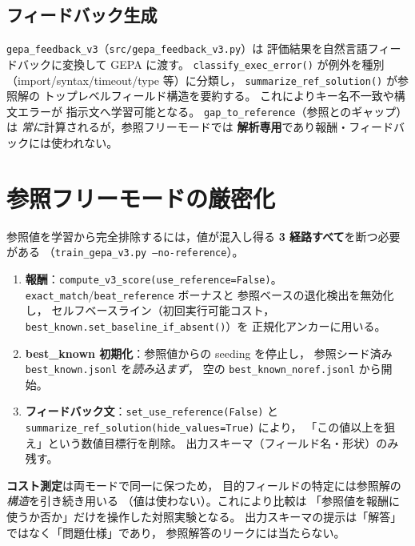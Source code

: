 \documentclass[uplatex,dvipdfmx,a4paper,11pt]{jsarticle}
\begin{document}
\subsection{フィードバック生成}

\texttt{gepa\_feedback\_v3}（\texttt{src/gepa\_feedback\_v3.py}）は
評価結果を自然言語フィードバックに変換して GEPA に渡す。
\texttt{classify\_exec\_error()} が例外を種別
（import/syntax/timeout/type 等）に分類し，
\texttt{summarize\_ref\_solution()} が参照解の
トップレベルフィールド構造を要約する。
これによりキー名不一致や構文エラーが
指示文へ学習可能となる。
\texttt{gap\_to\_reference}（参照とのギャップ）は
\emph{常に}計算されるが，参照フリーモードでは
\textbf{解析専用}であり報酬・フィードバックには使われない。

\section{参照フリーモードの厳密化}\label{sec:noref}

参照値を学習から完全排除するには，値が混入し得る
\textbf{3 経路すべて}を断つ必要がある
（\texttt{train\_gepa\_v3.py --no-reference}）。

\begin{enumerate}
  \item \textbf{報酬}：\texttt{compute\_v3\_score(use\_reference=False)}。
    \texttt{exact\_match}/\texttt{beat\_reference} ボーナスと
    参照ベースの退化検出を無効化し，
    セルフベースライン（初回実行可能コスト，
    \texttt{best\_known.set\_baseline\_if\_absent()}）を
    正規化アンカーに用いる。
  \item \textbf{best\_known 初期化}：参照値からの seeding を停止し，
    参照シード済み \texttt{best\_known.jsonl} を\emph{読み込まず}，
    空の \texttt{best\_known\_noref.jsonl} から開始。
  \item \textbf{フィードバック文}：\texttt{set\_use\_reference(False)} と
    \texttt{summarize\_ref\_solution(hide\_values=True)} により，
    「この値以上を狙え」という数値目標行を削除。
    出力スキーマ（フィールド名・形状）のみ残す。
\end{enumerate}

\textbf{コスト測定}は両モードで同一に保つため，
目的フィールドの特定には参照解の\emph{構造}を引き続き用いる
（値は使わない）。これにより比較は
「参照値を報酬に使うか否か」だけを操作した対照実験となる。
出力スキーマの提示は「解答」ではなく「問題仕様」であり，
参照解答のリークには当たらない。
\end{document}
